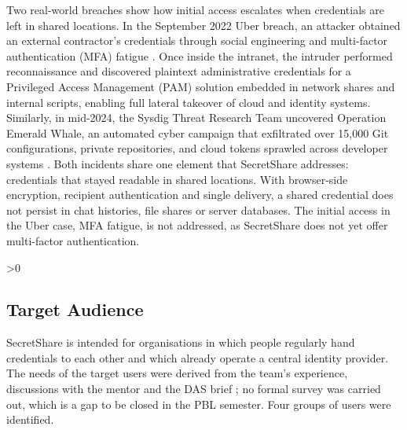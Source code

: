 \documentclass[12pt,a4paper]{article}
\numberwithin{equation}{section}
\numberwithin{figure}{section}
\numberwithin{table}{section}
\newcommand{\subsec}[1]{%
  \ifnum\value{subsection}>0\clearpage\fi
  \subsection{#1}%
}
\begin{document}
Two real-world breaches show how initial access escalates when credentials are left in shared locations. In the September 2022 Uber breach, an attacker obtained an external contractor's credentials through social engineering and multi-factor authentication (MFA) fatigue \cite{uber2022}. Once inside the intranet, the intruder performed reconnaissance and discovered plaintext administrative credentials for a Privileged Access Management (PAM) solution embedded in network shares and internal scripts, enabling full lateral takeover of cloud and identity systems. Similarly, in mid-2024, the Sysdig Threat Research Team uncovered Operation Emerald Whale, an automated cyber campaign that exfiltrated over 15,000 Git configurations, private repositories, and cloud tokens sprawled across developer systems \cite{emeraldwhale2024}. Both incidents share one element that SecretShare addresses: credentials that stayed readable in shared locations. With browser-side encryption, recipient authentication and single delivery, a shared credential does not persist in chat histories, file shares or server databases. The initial access in the Uber case, MFA fatigue, is not addressed, as SecretShare does not yet offer multi-factor authentication.

\subsec{Target Audience}

SecretShare is intended for organisations in which people regularly hand credentials to each other and which already operate a central identity provider. The needs of the target users were derived from the team's experience, discussions with the mentor and the DAS brief \cite{dasbrief}; no formal survey was carried out, which is a gap to be closed in the PBL semester. Four groups of users were identified.
\end{document}
